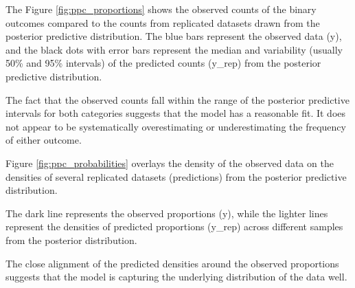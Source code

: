 \documentclass[a4paper]{artikel3}
\begin{document}
The Figure \ref{fig:ppc_proportions} shows the observed counts of the binary outcomes compared to the counts from replicated datasets drawn from the posterior predictive distribution. The blue bars represent the observed data (y), and the black dots with error bars represent the median and variability (usually 50\% and 95\% intervals) of the predicted counts (y\_rep) from the posterior predictive distribution.

The fact that the observed counts fall within the range of the posterior predictive intervals for both categories suggests that the model has a reasonable fit. It does not appear to be systematically overestimating or underestimating the frequency of either outcome.

Figure \ref{fig:ppc_probabilities} overlays the density of the observed data on the densities of several replicated datasets (predictions) from the posterior predictive distribution.

The dark line represents the observed proportions (y), while the lighter lines represent the densities of predicted proportions (y\_rep) across different samples from the posterior distribution.

The close alignment of the predicted densities around the observed proportions suggests that the model is capturing the underlying distribution of the data well. 
\end{document}
